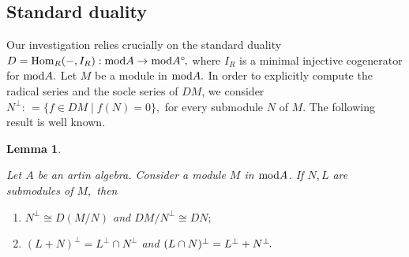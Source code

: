 \documentclass[10pt]{amsart}
\newtheorem{Lemma}[Theo]{Lemma}
\theoremstyle{definition}
\newcommand{\Hom}{{\rm Hom}}
\newcommand{\mmod}{{\rm mod}}
\newcommand{\soc}{{\rm soc}\hspace{.5pt}}
\newcommand{\vp}{\vspace{.5pt}}
\begin{document}



\subsection{\sc Standard duality} Our investigation relies crucially on the standard duality $D=\Hom_R(-, I_R): \mmod A \to \mmod A^\circ\hspace{-1pt},$ where $I_R$ is a minimal injective cogenerator for $\mmod A.$ Let $M$ be a module in $\mmod A.$ In order to explicitly compute the radical series and the socle series of $DM$, we consider $N^\perp\!: \, =\{f\in DM \mid f(N)=0\},$ for every submodule $N$ of $M$. The following result is well known.

\begin{Lemma}\label{dual_perp}

Let $A$ be an artin algebra. Consider a module $M$ in $\mmod A$. If $N, L$ are submodules of $M,$ then 

\begin{enumerate}[$(1)$]

\vspace{-.5pt}

\item $N^\perp \cong D(M/N)$ and $DM/N^{\perp}\cong DN;$ 

\vp\vp

\item $(L+N)^\perp=L^\perp \cap N^\perp$ and $(L\cap N)^\perp=L^\perp + N^\perp\hspace{-1pt}.$ 

\end{enumerate}\end{Lemma}
\end{document}
